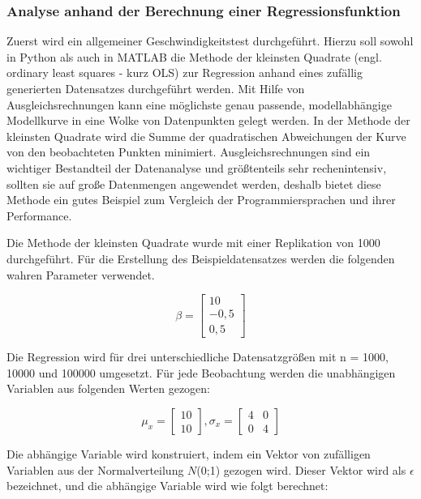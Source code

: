 \subsubsection{Analyse anhand der Berechnung einer Regressionsfunktion}

Zuerst wird ein allgemeiner Geschwindigkeitstest durchgeführt. Hierzu soll sowohl in Python als auch in MATLAB die Methode der kleinsten Quadrate (engl. ordinary least squares - kurz OLS) zur Regression anhand eines zufällig generierten Datensatzes durchgeführt werden. Mit Hilfe von Ausgleichsrechnungen kann eine möglichste genau passende, modellabhängige Modellkurve in eine Wolke von Datenpunkten gelegt werden. In der Methode der kleinsten Quadrate wird die Summe der quadratischen Abweichungen der Kurve von den beobachteten Punkten minimiert. Ausgleichsrechnungen sind ein wichtiger Bestandteil der Datenanalyse und größtenteils sehr rechenintensiv, sollten sie auf große Datenmengen angewendet werden, deshalb bietet diese Methode ein gutes Beispiel zum Vergleich der Programmiersprachen und ihrer Performance.\cite{kleinsteQuadrate}

Die Methode der kleinsten Quadrate wurde mit einer Replikation von 1000 durchgeführt. Für die Erstellung des Beispieldatensatzes werden die folgenden wahren Parameter verwendet.

\begin{equation}
	\beta = \begin{bmatrix}
	 	10\\ 
	 	-0,5\\ 
	 	0,5
	\end{bmatrix}
\end{equation} 

Die Regression wird für drei unterschiedliche Datensatzgrößen mit n = 1000, 10000 und 100000 umgesetzt. Für jede Beobachtung werden die unabhängigen Variablen aus folgenden Werten gezogen:

\begin{equation}
	\mu _{x} = \begin{bmatrix}
		10\\ 
		10
	\end{bmatrix}
	, \sigma _{x} = \begin{bmatrix}
		4 & 0\\ 
		0 & 4
	\end{bmatrix}
\end{equation} 

Die abhängige Variable wird konstruiert, indem ein Vektor von zufälligen Variablen aus der Normalverteilung $N$(0;1) gezogen wird. Dieser Vektor wird als $ \epsilon $ bezeichnet, und die abhängige Variable wird wie folgt berechnet:

